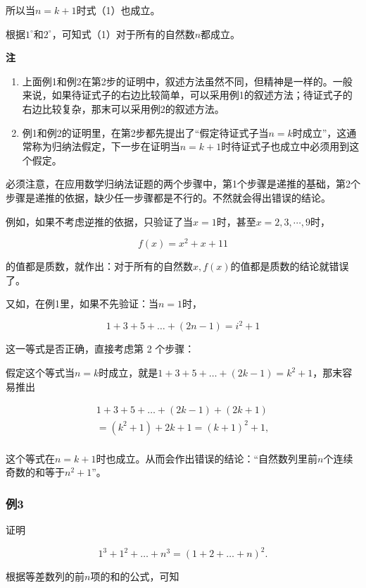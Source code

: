 所以当\(n = k + 1\)时式（1）也成立。

根据\(1^{\circ}\)和\(2^{\circ}\)，可知式（1）对于所有的自然数\(n\)都成立。

\textbf{注}

\begin{enumerate}
\item
  上面例1和例2在第2步的证明中，叙述方法虽然不同，但精神是一样的。一般来说，如果待证式子的右边比较简单，可以采用例1的叙述方法；待证式子的右边比较复杂，那末可以采用例2的叙述方法。
\item
  例1和例2的证明里，在第2步都先提出了``假定待证式子当\(n = k\)时成立''，这通常称为归纳法假定，下一步在证明当\(n = k + 1\)时待证式子也成立中必须用到这个假定。
\end{enumerate}

必须注意，在应用数学归纳法证题的两个步骤中，第1个步骤是递推的基础，第2个步骤是递推的依据，缺少任一步骤都是不行的。不然就会得出错误的结论。

例如，如果不考虑逆推的依据，只验证了当\(x = 1\)时，甚至\(x = 2, 3, \cdots, 9\)时，

\[
f (x) = x^{2} + x + 11
\]

的值都是质数，就作出：对于所有的自然数\(x, f(x)\)的值都是质数的结论就错误了。

又如，在例1里，如果不先验证：当\(n = 1\)时，

\[
1 + 3 + 5 + \dots + (2 n - 1) = i^{2} + 1
\]

这一等式是否正确，直接考虑第 2 个步骤：

假定这个等式当\(n = k\)时成立，就是\(1 + 3 + 5 + \dots + (2k - 1) = k^2 + 1\)，那末容易推出

\[
\begin{array}{l} 1 + 3 + 5 + \dots + (2 k - 1) + (2 k + 1) \\ = (k^{2} + 1) + 2 k + 1 = (k + 1)^{2} + 1, \\ \end{array}
\]

这个等式在\(n = k + 1\)时也成立。从而会作出错误的结论：``自然数列里前\(n\)个连续奇数的和等于\(n^2 + 1\)''。

\subsubsection{例3}

证明

\[
1^{3} + 1^{2} + \dots + n^{3} = (1 + 2 + \dots + n)^{2}. \tag {1}
\]

 根据等差数列的前\(n\)项的和的公式，可知

